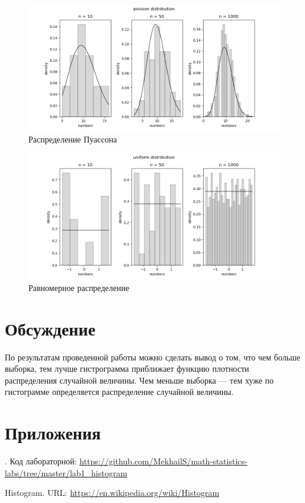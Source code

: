 \documentclass[12pt,a4paper]{article}
\begin{document}
\begin{figure}[h!]
	\centering
	\includegraphics[scale=0.7]{poisson.png}
	\caption{Распределение Пуассона}
	\label{fig:image}
\end{figure}

\pagebreak

\begin{figure}[h!]
	\centering
	\includegraphics[scale=0.7]{uniform.png}
	\caption{Равномерное распределение}
	\label{fig:image}
\end{figure}
\pagebreak

\section{Обсуждение}
По результатам проведенной работы можно сделать вывод о том, что чем больше выборка, тем лучше гистрограмма приближает функцию плотности распределения случайной величины. Чем меньше выборка — тем хуже по гистограмме определяется распределение случайной величины.
\pagebreak

\section{Приложения}
. Код лабораторной: {\url{https://github.com/MekhailS/math-statistics-labs/tree/master/lab1_histogram}}

\begin{thebibliography}{9} 
	 Histogram. URL: {\url{https://en.wikipedia.org/wiki/Histogram}}
\end{thebibliography}
\end{document}
